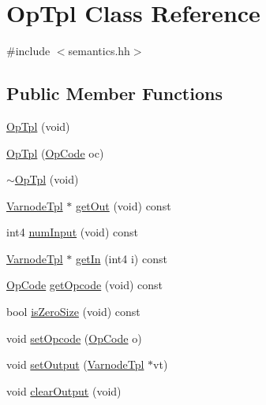 \hypertarget{class_op_tpl}{}\section{Op\+Tpl Class Reference}
\label{class_op_tpl}


{\ttfamily \#include $<$semantics.\+hh$>$}

\subsection*{Public Member Functions}
\begin{DoxyCompactItemize}
\item 
\mbox{\hyperlink{class_op_tpl_a7f94edad0bde40456f2b7a45290310df}{Op\+Tpl}} (void)
\item 
\mbox{\hyperlink{class_op_tpl_aac69f238eb6183b9961a69c6151abdf4}{Op\+Tpl}} (\mbox{\hyperlink{opcodes_8hh_abeb7dfb0e9e2b3114e240a405d046ea7}{Op\+Code}} oc)
\item 
\mbox{\hyperlink{class_op_tpl_ad20e34d5ee13cf1df198df20294a2543}{$\sim$\+Op\+Tpl}} (void)
\item 
\mbox{\hyperlink{class_varnode_tpl}{Varnode\+Tpl}} $\ast$ \mbox{\hyperlink{class_op_tpl_a043e955d86d8133fbc7606c08bcb0194}{get\+Out}} (void) const
\item 
int4 \mbox{\hyperlink{class_op_tpl_ae80f4c316de0e768c704b120d46c05a6}{num\+Input}} (void) const
\item 
\mbox{\hyperlink{class_varnode_tpl}{Varnode\+Tpl}} $\ast$ \mbox{\hyperlink{class_op_tpl_ab554689cf37b6c0e96ba118835f06011}{get\+In}} (int4 i) const
\item 
\mbox{\hyperlink{opcodes_8hh_abeb7dfb0e9e2b3114e240a405d046ea7}{Op\+Code}} \mbox{\hyperlink{class_op_tpl_aa553f6070fcf500f8d24af5f8e9f5da2}{get\+Opcode}} (void) const
\item 
bool \mbox{\hyperlink{class_op_tpl_a4eef0c979a1d23e5e761102ad6530fb6}{is\+Zero\+Size}} (void) const
\item 
void \mbox{\hyperlink{class_op_tpl_a6bc4e171686dd6c78bb8c9552d87fbb2}{set\+Opcode}} (\mbox{\hyperlink{opcodes_8hh_abeb7dfb0e9e2b3114e240a405d046ea7}{Op\+Code}} o)
\item 
void \mbox{\hyperlink{class_op_tpl_a650e793602afb0b054b2270087276c70}{set\+Output}} (\mbox{\hyperlink{class_varnode_tpl}{Varnode\+Tpl}} $\ast$vt)
\item 
void \mbox{\hyperlink{class_op_tpl_aae59dffa1447b0165891f31663529c6a}{clear\+Output}} (void)
\item 

\end{DoxyCompactItemize}

